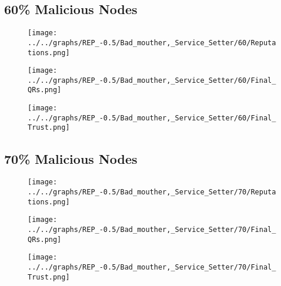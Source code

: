 \begin{minipage}[t]{0.49\columnwidth}
\subsection*{60\% Malicious Nodes}
    \begin{figure}[H]
        \centering
        \texttt{[image: ../../graphs/REP\_-0.5/Bad\_mouther,\_Service\_Setter/60/Reputations.png]}
    \end{figure}
    \begin{figure}[H]
        \centering
        \texttt{[image: ../../graphs/REP\_-0.5/Bad\_mouther,\_Service\_Setter/60/Final\_QRs.png]}
    \end{figure}
\end{minipage}
\begin{minipage}[t]{0.49\columnwidth}
    \begin{figure}[H]
        \centering
        \texttt{[image: ../../graphs/REP\_-0.5/Bad\_mouther,\_Service\_Setter/60/Final\_Trust.png]}
    \end{figure}
\end{minipage}

\begin{minipage}[t]{0.49\columnwidth}
\subsection*{70\% Malicious Nodes}
    \begin{figure}[H]
        \centering
        \texttt{[image: ../../graphs/REP\_-0.5/Bad\_mouther,\_Service\_Setter/70/Reputations.png]}
    \end{figure}
    \begin{figure}[H]
        \centering
        \texttt{[image: ../../graphs/REP\_-0.5/Bad\_mouther,\_Service\_Setter/70/Final\_QRs.png]}
    \end{figure}
\end{minipage}
\begin{minipage}[t]{0.49\columnwidth}
    \begin{figure}[H]
        \centering
        \texttt{[image: ../../graphs/REP\_-0.5/Bad\_mouther,\_Service\_Setter/70/Final\_Trust.png]}
    \end{figure}
\end{minipage}
\newpage

